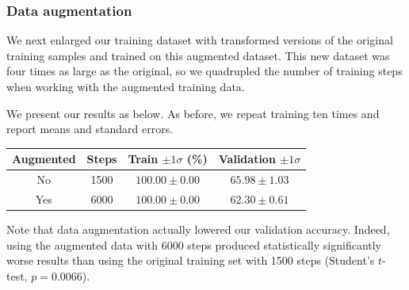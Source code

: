 \documentclass{article}
\begin{document}
\begin{multicols}{2}
\subsubsection{Data augmentation}

We next enlarged our training dataset
with transformed versions of the original training samples
and trained on this augmented dataset.
This new dataset was four times as large as the original,
so we quadrupled the number of training steps
when working with the augmented training data.

We present our results as below.
As before, we repeat training ten times
and report means and standard errors.
\begin{center}
    \begin{tabular}{cc|cc}
        Augmented & Steps & Train $\pm 1 \sigma$ (\%) & Validation $\pm 1 \sigma$\\\hline
        No  & 1500 & $100.00 \pm 0.00$ & $65.98 \pm 1.03$ \\
        Yes & 6000 & $100.00 \pm 0.00$ & $62.30 \pm 0.61$
    \end{tabular}
\end{center}

Note that data augmentation actually lowered our validation accuracy.
Indeed, using the augmented data with 6000 steps
produced statistically significantly worse results
than using the original training set with 1500 steps
(Student's $t$-test, $p=0.0066$).







\end{multicols}
\end{document}
